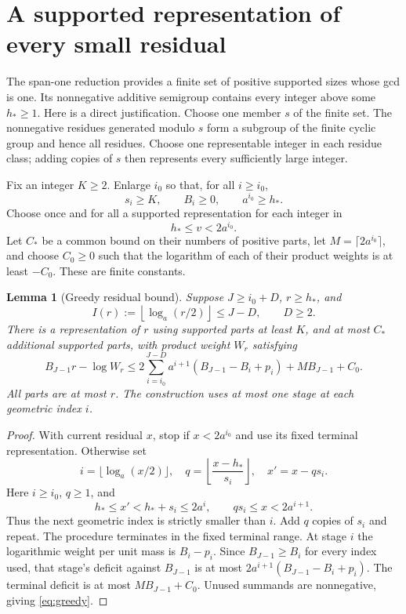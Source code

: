 \documentclass[11pt]{amsart}
\newtheorem{lemma}[theorem]{Lemma}
\theoremstyle{remark}\newtheorem{remark}[theorem]{Remark}
\begin{document}
\section{A supported representation of every small residual}\label{sec:residual}
The span-one reduction provides a finite set of positive supported sizes
whose gcd is one. Its nonnegative additive semigroup contains every integer
above some $h_*\ge1$. Here is a direct justification. Choose one member
$s$ of the finite set. The nonnegative residues generated modulo $s$ form
a subgroup of the finite cyclic group and hence all residues. Choose one
representable integer in each residue class; adding copies of $s$ then
represents every sufficiently large integer.

Fix an integer $K\ge2$. Enlarge $i_0$ so that, for all $i\ge i_0$,
\begin{equation}\label{eq:start}
 s_i\ge K,\qquad B_i\ge0,\qquad a^{i_0}\ge h_*.
\end{equation}
Choose once and for all a supported representation for each integer in
\[
 h_*\le v<2a^{i_0}.
\]
Let $C_*$ be a common bound on their numbers of positive parts, let
$M=\lceil2a^{i_0}\rceil$, and choose $C_0\ge0$ such that the logarithm of
each of their product weights is at least $-C_0$. These are finite constants.

\begin{lemma}[Greedy residual bound]\label{lem:greedy}
Suppose $J\ge i_0+D$, $r\ge h_*$, and
\[
 I(r):=\left\lfloor\log_a(r/2)\right\rfloor\le J-D,
 \qquad D\ge2.
\]
There is a representation of $r$ using supported parts at least $K$, and
at most $C_*$ additional supported parts, with product weight $W_r$ satisfying
\begin{equation}\label{eq:greedy}
 B_{J-1}r-\log W_r
 \le 2\sum_{i=i_0}^{J-D}a^{i+1}
       (B_{J-1}-B_i+p_i)+MB_{J-1}+C_0.
\end{equation}
All parts are at most $r$. The construction uses at most one stage at each
geometric index $i$.
\end{lemma}

\begin{proof}
With current residual $x$, stop if $x<2a^{i_0}$ and use its fixed terminal
representation. Otherwise set
\[
 i=\lfloor\log_a(x/2)\rfloor,\quad
 q=\left\lfloor\frac{x-h_*}{s_i}\right\rfloor,\quad
 x'=x-qs_i.
\]
Here $i\ge i_0$, $q\ge1$, and
\[
 h_*\le x'<h_*+s_i\le2a^i,\qquad qs_i\le x<2a^{i+1}.
\]
Thus the next geometric index is strictly smaller than $i$. Add $q$ copies
of $s_i$ and repeat. The procedure terminates in the fixed terminal range.
At stage $i$ the logarithmic weight per unit mass is $B_i-p_i$.
Since $B_{J-1}\ge B_i$ for every index used, that stage's deficit against
$B_{J-1}$ is at most
$2a^{i+1}(B_{J-1}-B_i+p_i)$. The terminal deficit is at most
$MB_{J-1}+C_0$. Unused summands are nonnegative, giving \eqref{eq:greedy}.
\end{proof}
\end{document}
